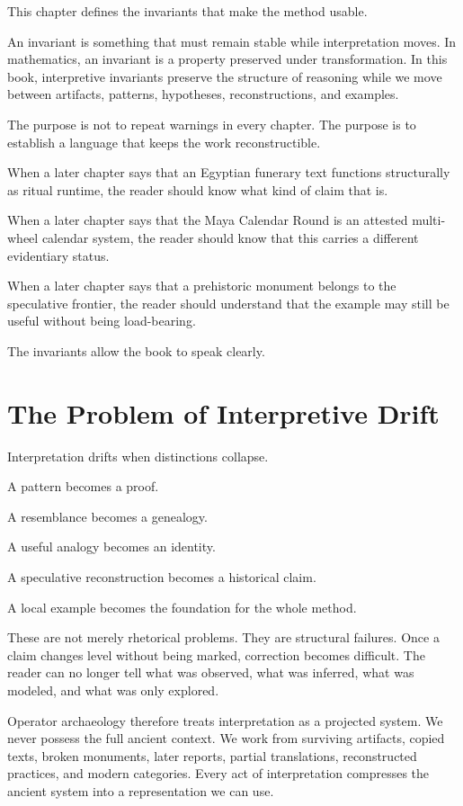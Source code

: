 \documentclass[11pt]{book}
\begin{document}
This chapter defines the invariants that make the method usable.

An invariant is something that must remain stable while interpretation moves. In mathematics, an invariant is a property preserved under transformation. In this book, interpretive invariants preserve the structure of reasoning while we move between artifacts, patterns, hypotheses, reconstructions, and examples.

The purpose is not to repeat warnings in every chapter. The purpose is to establish a language that keeps the work reconstructible.

When a later chapter says that an Egyptian funerary text functions structurally as ritual runtime, the reader should know what kind of claim that is.

When a later chapter says that the Maya Calendar Round is an attested multi-wheel calendar system, the reader should know that this carries a different evidentiary status.

When a later chapter says that a prehistoric monument belongs to the speculative frontier, the reader should understand that the example may still be useful without being load-bearing.

The invariants allow the book to speak clearly.

\section{The Problem of Interpretive Drift}

Interpretation drifts when distinctions collapse.

A pattern becomes a proof.

A resemblance becomes a genealogy.

A useful analogy becomes an identity.

A speculative reconstruction becomes a historical claim.

A local example becomes the foundation for the whole method.

These are not merely rhetorical problems. They are structural failures. Once a claim changes level without being marked, correction becomes difficult. The reader can no longer tell what was observed, what was inferred, what was modeled, and what was only explored.

Operator archaeology therefore treats interpretation as a projected system. We never possess the full ancient context. We work from surviving artifacts, copied texts, broken monuments, later reports, partial translations, reconstructed practices, and modern categories. Every act of interpretation compresses the ancient system into a representation we can use.
\end{document}
